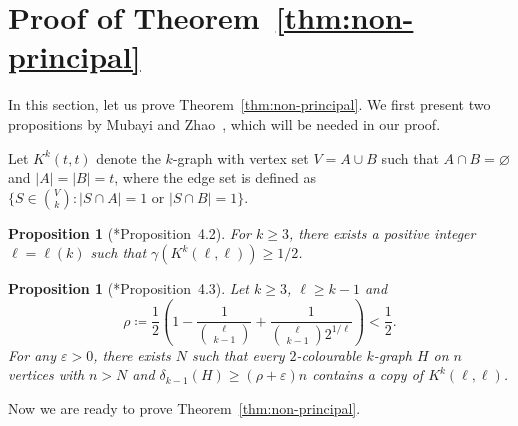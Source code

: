 \documentclass[11pt,a4paper]{article}
\newtheorem{proposition}[definition]{Proposition}
\theoremstyle{remark}
\begin{document}
 \section{Proof of Theorem~\ref{thm:non-principal}}\label{sec:non-principal}
In this section, let us prove Theorem~\ref{thm:non-principal}. We first present two propositions by Mubayi and Zhao~\cite{MZ07}, which will be needed in our proof. 

Let $K^k(t,t)$ denote the $k$-graph with vertex set $V=A\cup B$ such that $A\cap B=\varnothing$ and $|A|=|B|=t$, where the edge set is defined as $\{S\in \binom{V}{k} \colon |S\cap A|=1\text{ or }|S\cap B|=1\}$. 

\begin{proposition}[\cite{MZ07}*{Proposition~4.2}]
\label{prop:MZ1}
    For $k\ge 3$, there exists a positive integer $\ell=\ell(k)$ such that $\gamma(K^k(\ell,\ell))\ge 1/2$.
\end{proposition}

\begin{proposition}[\cite{MZ07}*{Proposition~4.3}]
\label{prop:MZ2}
    Let $k\ge 3$, $\ell\ge k-1$ and 
    \[
    \rho \coloneqq \frac{1}{2}\left(1-\frac{1}{\binom{\ell}{k-1}}+\frac{1}{\binom{\ell}{k-1}2^{1/\ell}}\right)<\frac{1}{2}.
    \]
    For any $\varepsilon>0$, there exists $N$ such that every $2$-colourable $k$-graph $H$ on $n$ vertices with $n>N$ and $\delta_{k-1}(H)\ge (\rho+\varepsilon)n$ contains a copy of $K^k(\ell,\ell)$.
\end{proposition}

Now we are ready to prove Theorem~\ref{thm:non-principal}.
\end{document}
